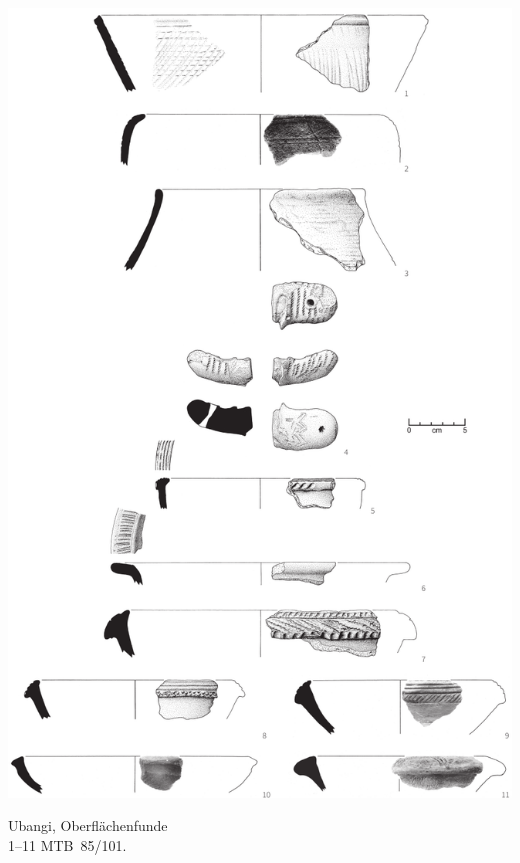 \begin{pl}[H]
	\includegraphics{plt/Taf13.pdf}
	\vspace{.75em}\caption{\mbox{Ubangi}, Oberflächenfunde \\ 1--11 MTB~85/101.}
	\label{pl:13}
\end{pl}

